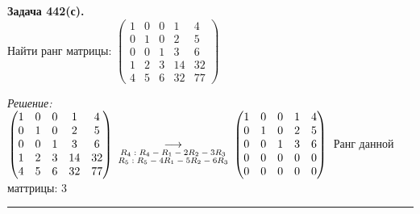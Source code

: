\documentclass[a4paper, 12pt]{article}
\newenvironment{problem}[2][Задача]
{ \begin{mdframed}[backgroundcolor=gray!10] \textbf{#1 #2.} \\}
	{  \end{mdframed}}
\newenvironment{solution}
{\textit{Решение:}\vspace{.1cm}\\}
{\vspace{.1cm}\noindent\rule{7in}{1.5pt}}
\begin{document}
\begin{problem}{442(с)}
Найти ранг матрицы:
$\left(\begin{array}{rrrrr}1 & 0 & 0 & 1 & 4\\0 & 1 & 0 & 2 & 5\\ 0 & 0 & 1 & 3 & 6 \\ 1 & 2 & 3 & 14 & 32\\ 4 & 5 & 6 & 32 & 77\end{array}\right)$

\end{problem}
\begin{solution}

$
\begin{pmatrix}
	1 & 0 & 0 & 1 & 4\\
	0 & 1 & 0 & 2 & 5\\ 
	0 & 0 & 1 & 3 & 6 \\ 
	1 & 2 & 3 & 14 & 32\\ 
	4 & 5 & 6 & 32 & 77\\
\end{pmatrix} \:
\underset{
	\begin{subarray}{c}
		\text{$R_4: R_4-R_1-2R_2-3R_3$}\\
		\text{$R_5: R_5-4R_1-5R_2-6R_3$}\\
	\end{subarray}
}{\longrightarrow} \:
\begin{pmatrix}
	1 & 0 & 0 & 1 & 4\\
	0 & 1 & 0 & 2 & 5\\
	0 & 0 & 1 & 3 & 6\\
	0 & 0 & 0 & 0 & 0\\
	0 & 0 & 0 & 0 & 0\\
\end{pmatrix}\\
$
Ранг данной маттрицы: 3\\

\end{solution} 
\end{document}
